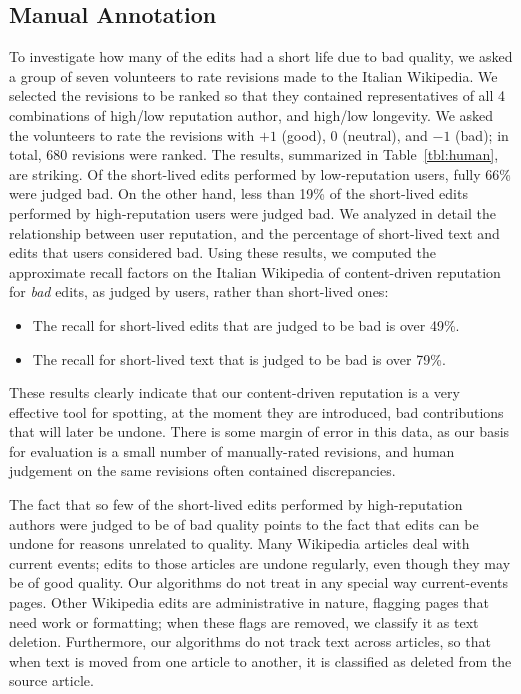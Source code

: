 \subsection{Manual Annotation}

To investigate how many of the edits had a short life due to bad quality,
we asked a group of seven volunteers to rate revisions made to the
Italian Wikipedia. 
We selected the revisions to be ranked so that they contained
representatives of all 4 combinations of high/low reputation author,
and high/low longevity. 
We asked the volunteers to rate the revisions with $+1$ (good), 
$0$ (neutral), and $-1$ (bad); in total, 680 revisions
were ranked. 
The results, summarized in Table~\ref{tbl:human}, are striking. 
Of the short-lived edits performed by low-reputation users, fully
66\% were judged bad. 
On the other hand, less than 19\% of the short-lived edits performed by
high-reputation users were judged bad. 
We analyzed in detail the relationship between user reputation, and
the percentage of short-lived text and edits that users considered bad. 
Using these results, we computed the approximate recall factors on the
Italian Wikipedia of content-driven reputation for {\em bad\/} edits,
as judged by users, rather than short-lived ones:
%
\begin{itemize}

\item The recall for short-lived edits that are judged to be bad is over
  49\%.

\item The recall for short-lived text that is judged to be bad is over
  79\%.

\end{itemize}
%
These results clearly indicate that our content-driven reputation is a
very effective tool for spotting, at the moment they are introduced,
bad contributions that will later be undone. 
There is some margin of error in this data, as our basis for
evaluation is a small number of manually-rated revisions, and human
judgement on the same revisions often contained discrepancies. 

The fact that so few of the short-lived edits performed by
high-reputation authors were judged to be of bad quality points to the
fact that edits can be undone for reasons unrelated to quality. 
Many Wikipedia articles deal with current events; edits to those
articles are undone regularly, even though they may be of good
quality. 
Our algorithms do not treat in any special way current-events pages. 
Other Wikipedia edits are administrative in nature, flagging pages that
need work or formatting; when these flags are removed, we classify it
as text deletion. 
Furthermore, our algorithms do not track text across articles, so that
when text is moved from one article to another, it is classified as
deleted from the source article.

